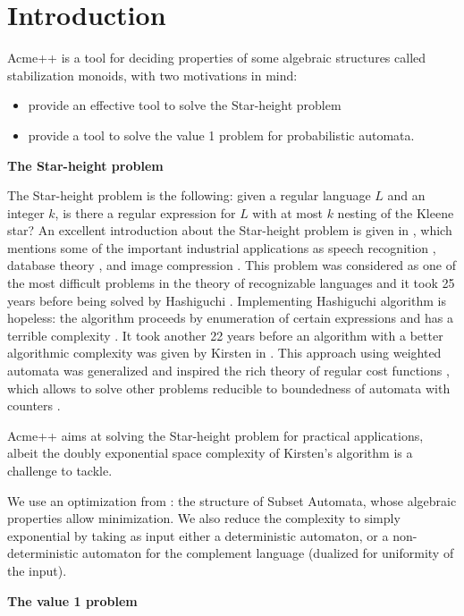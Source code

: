 \section{Introduction}

Acme++ is a tool for deciding properties of some algebraic structures called stabilization monoids,
with two motivations in mind:
\begin{itemize}
\item provide an effective tool to solve the Star-height problem
\item provide a tool to solve the value 1 problem for probabilistic automata.
\end{itemize}

\textbf{The Star-height problem}

The Star-height problem is the following: given a regular language $L$ and an integer $k$, is there a regular expression for $L$ with at most $k$ nesting of the Kleene star?
An excellent introduction about the Star-height problem is given in \cite{Kirsten05},
which mentions some of the important industrial applications as
speech recognition \cite{Mohri97}, database theory \cite{GT01}, and image compression \cite{CK93,KMT04}.
This problem was considered as one of the most difficult problems in the theory of recognizable languages
and it took 25 years before being solved by Hashiguchi \cite{Hashiguchi88}.
Implementing Hashiguchi algorithm is hopeless: the algorithm proceeds by enumeration of certain expressions
and has a terrible complexity \cite{LS02}.
It took another 22 years before an algorithm with a better algorithmic complexity was given by Kirsten in \cite{Kirsten05}.
This approach using weighted automata was generalized and inspired the rich theory of regular cost functions \cite{Colcombet09}, which allows to solve other problems reducible to boundedness of automata with counters \cite{CL08sh,CL08b,CKLB13}.

Acme++ aims at solving the Star-height problem for practical applications,
albeit the doubly exponential space complexity of Kirsten's algorithm is a challenge to tackle.

We use an optimization from \cite{CL08sh}: the structure of Subset Automata, whose algebraic properties allow minimization.
We also reduce the complexity to simply exponential by taking as input either a deterministic automaton, or a non-deterministic automaton for the complement language (dualized for uniformity of the input).
\smallskip

\textbf{The value 1 problem}

